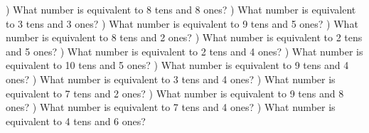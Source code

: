 \documentclass{article}%
\begin{document}
\newline%
\newline%
) What number is equivalent to 8 tens and 8 ones?%
\newline%
\newline%
) What number is equivalent to 3 tens and 3 ones?%
\newline%
\newline%
) What number is equivalent to 9 tens and 5 ones?%
\newline%
\newline%
) What number is equivalent to 8 tens and 2 ones?%
\newline%
\newline%
) What number is equivalent to 2 tens and 5 ones?%
\newline%
\newline%
) What number is equivalent to 2 tens and 4 ones?%
\newline%
\newline%
) What number is equivalent to 10 tens and 5 ones?%
\newline%
\newline%
) What number is equivalent to 9 tens and 4 ones?%
\newline%
\newline%
) What number is equivalent to 3 tens and 4 ones?%
\newline%
\newline%
) What number is equivalent to 7 tens and 2 ones?%
\newline%
\newline%
) What number is equivalent to 9 tens and 8 ones?%
\newline%
\newline%
) What number is equivalent to 7 tens and 4 ones?%
\newline%
\newline%
) What number is equivalent to 4 tens and 6 ones?%
\end{document}
